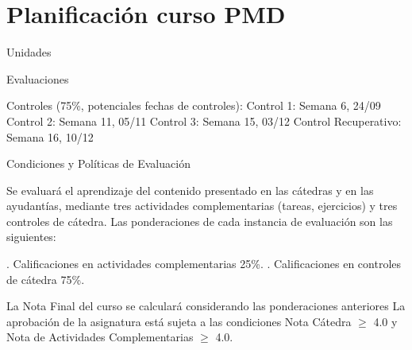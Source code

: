 \documentclass{beamer}
\begin{document}
 
  \section{Planificación curso PMD}
 \begin{frame}{Unidades}
 


  \end{frame}
  
  \begin{frame}{Evaluaciones}
  \begin{outline}
  	
  	\1 Controles (75\%, potenciales fechas de controles):
	\2  Control 1: Semana 6, 24/09
        \2  Control 2: Semana 11, 05/11
        \2  Control 3: Semana 15, 03/12
        \2  Control Recuperativo: Semana 16, 10/12


	
  \end{outline}
  \end{frame}
  
  \begin{frame}{Condiciones y Políticas de Evaluación}
  \small
  \begin{outline}
   \1 Se evaluará el aprendizaje del contenido presentado en las cátedras y en las ayudantías, mediante tres actividades complementarias (tareas, ejercicios) y tres controles de cátedra. Las ponderaciones de cada instancia de evaluación son las siguientes:
   \begin{itemize}
   . Calificaciones en actividades complementarias 25\%.
  . Calificaciones en controles de cátedra 75\%.
  \end{itemize}
   \1 La Nota Final del curso se calculará considerando las ponderaciones anteriores
    \1 La aprobación de la asignatura está sujeta a las condiciones Nota Cátedra $ \ge $ 4.0 y Nota de Actividades Complementarias $ \ge $ 4.0.
  \end{outline}
  \end{frame}
  
\end{document}
